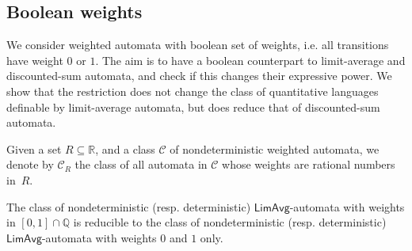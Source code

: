 \documentclass{llncs}
\newcommand{\rat}{{\mathbb Q}}
\newcommand{\real}{{\mathbb R}}
\newcommand{\C}{\mathcal{C}}
\newcommand{\LimAvg}{\mathsf{LimAvg}}
\begin{document}
\subsection{Boolean weights}

We consider weighted automata with boolean set of weights, i.e. all transitions have weight $0$ or $1$.
The aim is to have a boolean counterpart to limit-average and discounted-sum
automata, and check if this changes their expressive power.
We show that the restriction does not change the class of quantitative 
languages definable by limit-average automata, but does reduce that of
discounted-sum automata.

Given a set $R \subseteq \real$, and a class $\C$ of nondeterministic weighted automata,
we denote by $\C_R$ the class of all automata in $\C$ whose weights are rational numbers in~$R$.



\begin{theorem}
The class of nondeterministic (resp. deterministic) $\LimAvg$-automata with weights in $[0,1] \cap \rat$
is reducible to the class of nondeterministic (resp. deterministic) $\LimAvg$-automata with weights $0$ and $1$ only.
\end{theorem}
\end{document}
